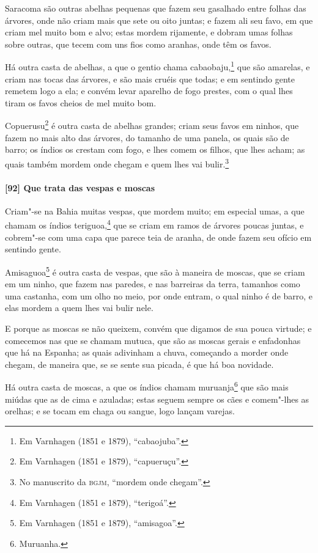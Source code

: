\begin{linenumbers}
Saracoma são outras abelhas pequenas que fazem seu gasalhado entre folhas das árvores,
onde não criam mais que sete ou oito juntas; e fazem ali seu favo, em que criam mel muito
bom e alvo; estas mordem rijamente, e dobram umas folhas sobre outras, que tecem com uns
fios como aranhas, onde têm os favos.

Há outra casta de abelhas, a que o gentio chama cabaobaju,\footnote{ Em Varnhagen (1851 e
1879), ``cabaojuba''.} que são amarelas, e criam nas tocas das árvores, e são mais cruéis
que todas; e em sentindo gente remetem logo a ela; e convém levar aparelho de fogo
prestes, com o qual lhes tiram os favos cheios de mel muito bom.

Copuerusu\footnote{ Em Varnhagen (1851 e 1879), ``capueruçu''.} é outra casta de abelhas
grandes; criam seus favos em ninhos, que fazem no mais alto das árvores, do tamanho de uma
panela, os quais são de barro; os índios os crestam com fogo, e lhes comem os filhos, que
lhes acham; as quais também mordem onde chegam e quem lhes vai bulir.\footnote{ No
manuscrito da \textsc{bgjm}, ``mordem onde chegam''.}

\paragraph{[92] Que trata das vespas e moscas}\quad
Criam"-se na Bahia muitas vespas, que mordem muito; em especial umas, a que chamam os
índios teriguoa,\footnote{ Em Varnhagen (1851 e 1879), ``terigoá''.} que se criam em ramos
de árvores poucas juntas, e cobrem"-se com uma capa que parece teia de aranha, de onde
fazem seu ofício em sentindo gente.

Amisaguoa\footnote{ Em Varnhagen (1851 e 1879), ``amisagoa''.} é outra casta de vespas,
que são à maneira de moscas, que se criam em um ninho, que fazem nas paredes, e nas
barreiras da terra, tamanhos como uma castanha, com um olho no meio, por onde entram, o
qual ninho é de barro, e elas mordem a quem lhes vai bulir nele.

E porque as moscas se não queixem, convém que digamos de sua pouca virtude; e comecemos
nas que se chamam mutuca, que são as moscas gerais e enfadonhas que há na Espanha; as
quais adivinham a chuva, começando a morder onde chegam, de maneira que, se se sente sua
picada, é que há boa novidade.

Há outra casta de moscas, a que os índios chamam muruanja\footnote{ Muruanha.} que são
mais miúdas que as de cima e azuladas; estas seguem sempre os cães e comem"-lhes as
orelhas; e se tocam em chaga ou sangue, logo lançam varejas.


\end{linenumbers}
